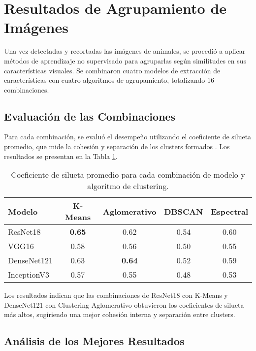 \section{Resultados de Agrupamiento de Imágenes}

Una vez detectadas y recortadas las imágenes de animales, se procedió a aplicar métodos de aprendizaje no supervisado para agruparlas según similitudes en sus características visuales. Se combinaron cuatro modelos de extracción de características con cuatro algoritmos de agrupamiento, totalizando 16 combinaciones.

\subsection{Evaluación de las Combinaciones}

Para cada combinación, se evaluó el desempeño utilizando el coeficiente de silueta promedio, que mide la cohesión y separación de los clusters formados \cite{rousseeuw1987silhouettes}. Los resultados se presentan en la Tabla \ref{average_silhouette}.

\begin{table}[!ht]
    \centering
    \begin{tabular}{lcccc}
        \hline
        \textbf{Modelo} & \textbf{K-Means} & \textbf{Aglomerativo} & \textbf{DBSCAN} & \textbf{Espectral} \\
        \hline
        ResNet18 & \textbf{0.65} & 0.62 & 0.54 & 0.60 \\
        VGG16 & 0.58 & 0.56 & 0.50 & 0.55 \\
        DenseNet121 & 0.63 & \textbf{0.64} & 0.52 & 0.59 \\
        InceptionV3 & 0.57 & 0.55 & 0.48 & 0.53 \\
        \hline
    \end{tabular}
    \caption{Coeficiente de silueta promedio para cada combinación de modelo y algoritmo de clustering.}
    \label{average_silhouette}
\end{table}

Los resultados indican que las combinaciones de ResNet18 con K-Means y DenseNet121 con Clustering Aglomerativo obtuvieron los coeficientes de silueta más altos, sugiriendo una mejor cohesión interna y separación entre clusters.

\subsection{Análisis de los Mejores Resultados}

